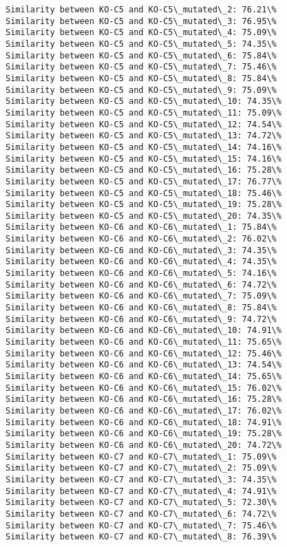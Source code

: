 \documentclass[11pt]{article}
\begin{document}
\begin{Verbatim}[commandchars=\\\{\}]
Similarity between KO-C5 and KO-C5\_mutated\_2: 76.21\%
Similarity between KO-C5 and KO-C5\_mutated\_3: 76.95\%
Similarity between KO-C5 and KO-C5\_mutated\_4: 75.09\%
Similarity between KO-C5 and KO-C5\_mutated\_5: 74.35\%
Similarity between KO-C5 and KO-C5\_mutated\_6: 75.84\%
Similarity between KO-C5 and KO-C5\_mutated\_7: 75.46\%
Similarity between KO-C5 and KO-C5\_mutated\_8: 75.84\%
Similarity between KO-C5 and KO-C5\_mutated\_9: 75.09\%
Similarity between KO-C5 and KO-C5\_mutated\_10: 74.35\%
Similarity between KO-C5 and KO-C5\_mutated\_11: 75.09\%
Similarity between KO-C5 and KO-C5\_mutated\_12: 74.54\%
Similarity between KO-C5 and KO-C5\_mutated\_13: 74.72\%
Similarity between KO-C5 and KO-C5\_mutated\_14: 74.16\%
Similarity between KO-C5 and KO-C5\_mutated\_15: 74.16\%
Similarity between KO-C5 and KO-C5\_mutated\_16: 75.28\%
Similarity between KO-C5 and KO-C5\_mutated\_17: 76.77\%
Similarity between KO-C5 and KO-C5\_mutated\_18: 75.46\%
Similarity between KO-C5 and KO-C5\_mutated\_19: 75.28\%
Similarity between KO-C5 and KO-C5\_mutated\_20: 74.35\%
Similarity between KO-C6 and KO-C6\_mutated\_1: 75.84\%
Similarity between KO-C6 and KO-C6\_mutated\_2: 76.02\%
Similarity between KO-C6 and KO-C6\_mutated\_3: 74.35\%
Similarity between KO-C6 and KO-C6\_mutated\_4: 74.35\%
Similarity between KO-C6 and KO-C6\_mutated\_5: 74.16\%
Similarity between KO-C6 and KO-C6\_mutated\_6: 74.72\%
Similarity between KO-C6 and KO-C6\_mutated\_7: 75.09\%
Similarity between KO-C6 and KO-C6\_mutated\_8: 75.84\%
Similarity between KO-C6 and KO-C6\_mutated\_9: 74.72\%
Similarity between KO-C6 and KO-C6\_mutated\_10: 74.91\%
Similarity between KO-C6 and KO-C6\_mutated\_11: 75.65\%
Similarity between KO-C6 and KO-C6\_mutated\_12: 75.46\%
Similarity between KO-C6 and KO-C6\_mutated\_13: 74.54\%
Similarity between KO-C6 and KO-C6\_mutated\_14: 75.65\%
Similarity between KO-C6 and KO-C6\_mutated\_15: 76.02\%
Similarity between KO-C6 and KO-C6\_mutated\_16: 75.28\%
Similarity between KO-C6 and KO-C6\_mutated\_17: 76.02\%
Similarity between KO-C6 and KO-C6\_mutated\_18: 74.91\%
Similarity between KO-C6 and KO-C6\_mutated\_19: 75.28\%
Similarity between KO-C6 and KO-C6\_mutated\_20: 74.72\%
Similarity between KO-C7 and KO-C7\_mutated\_1: 75.09\%
Similarity between KO-C7 and KO-C7\_mutated\_2: 75.09\%
Similarity between KO-C7 and KO-C7\_mutated\_3: 74.35\%
Similarity between KO-C7 and KO-C7\_mutated\_4: 74.91\%
Similarity between KO-C7 and KO-C7\_mutated\_5: 72.30\%
Similarity between KO-C7 and KO-C7\_mutated\_6: 74.72\%
Similarity between KO-C7 and KO-C7\_mutated\_7: 75.46\%
Similarity between KO-C7 and KO-C7\_mutated\_8: 76.39\%

\end{Verbatim}
\end{document}
